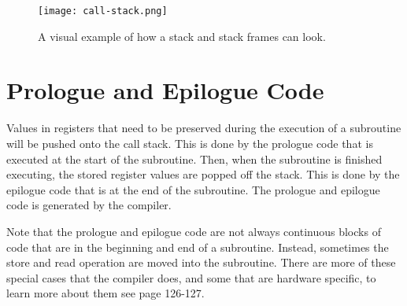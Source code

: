 \begin{figure}[!htb]
	\centering
	\texttt{[image: call-stack.png]}
	\caption{A visual example of how a stack and stack frames can look.}
	\label{fig:callstack}
\end{figure}





\section{Prologue and Epilogue Code}
 


Values in registers that need to be preserved during the execution of a subroutine will be pushed onto the call stack.
This is done by the prologue code that is executed at the start of the subroutine.
Then, when the subroutine is finished executing, the stored register values are popped off the stack.
This is done by the epilogue code that is at the end of the subroutine.
The prologue and epilogue code is generated by the compiler.


Note that the prologue and epilogue code are not always continuous blocks of code that are in the beginning and end of a subroutine.
Instead, sometimes the store and read operation are moved into the subroutine.
There are more of these special cases that the compiler does, and some that are hardware specific, to learn more about them see \cite{dwarf} page 126-127.



